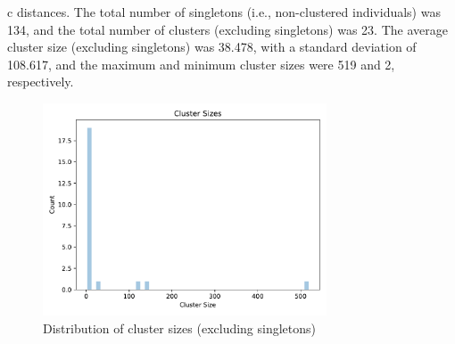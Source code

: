 \documentclass{article}
\begin{document}
c distances. The total number of singletons (i.e., non-clustered individuals) was 134, and the total number of clusters (excluding singletons) was 23. The average cluster size (excluding singletons) was 38.478, with a standard deviation of 108.617, and the maximum and minimum cluster sizes were 519 and 2, respectively.

\begin{figure}[h]
\centering
\includegraphics[width=0.75\textwidth,keepaspectratio]{./figs/cluster_sizes.pdf}
\caption{Distribution of cluster sizes (excluding singletons)}
\end{figure}
\end{document}
